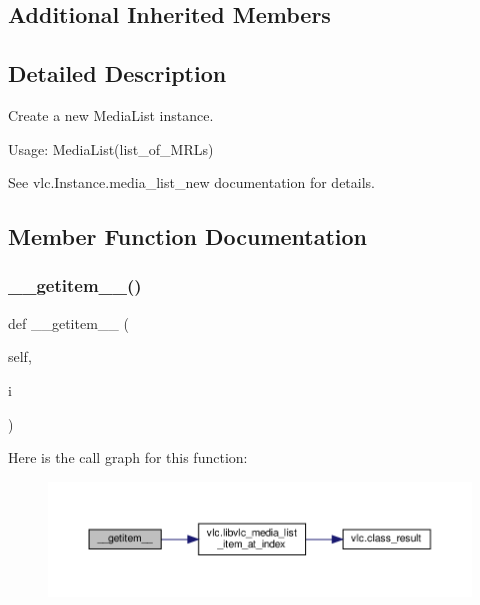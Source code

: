 \subsection*{Additional Inherited Members}


\subsection{Detailed Description}
\begin{DoxyVerb}Create a new MediaList instance.

Usage: MediaList(list_of_MRLs)

See vlc.Instance.media_list_new documentation for details.\end{DoxyVerb}
 

\subsection{Member Function Documentation}
\mbox{\label{classvlc_1_1_media_list_af2c6b7930c773edecd6d320e4c263421}} 
\subsubsection{\texorpdfstring{\+\_\+\+\_\+getitem\+\_\+\+\_\+()}{\_\_getitem\_\_()}}
{\footnotesize\ttfamily def \+\_\+\+\_\+getitem\+\_\+\+\_\+ (\begin{DoxyParamCaption}\item[{}]{self,  }\item[{}]{i }\end{DoxyParamCaption})}

Here is the call graph for this function\+:
\nopagebreak
\begin{figure}[H]
\begin{center}
\leavevmode
\includegraphics[width=350pt]{classvlc_1_1_media_list_af2c6b7930c773edecd6d320e4c263421_cgraph}
\end{center}
\end{figure}
\mbox{\label{classvlc_1_1_media_list_a45163c19b7c87f553c6f1d055d4668cb}} 
